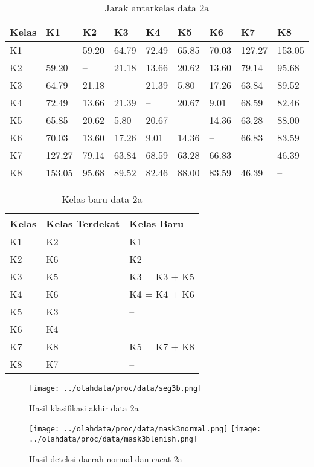 \documentclass[laporan.tex]{subfiles}
\begin{document}
\begin{table}[h!]
\centering
\begin{tabular}{|l|l|l|l|l|l|l|l|l|}
\hline
Kelas & K1 & K2 & K3 & K4 & K5 & K6 & K7 & K8 \\
\hline
K1 & -- & 59.20 & 64.79 & 72.49 & 65.85 & 70.03 & 127.27 & 153.05 \\
K2 & 59.20 & -- & 21.18 & 13.66 & 20.62 & 13.60 & 79.14 & 95.68 \\
K3 & 64.79 & 21.18 & --	& 21.39 & 5.80 & 17.26 & 63.84 & 89.52 \\
K4 & 72.49 & 13.66 & 21.39 & --	& 20.67 & 9.01 & 68.59 & 82.46 \\
K5 & 65.85 & 20.62 & 5.80 & 20.67 & -- & 14.36 & 63.28 & 88.00 \\
K6 & 70.03 & 13.60 & 17.26 & 9.01 & 14.36 & -- & 66.83 & 83.59 \\
K7 & 127.27 & 79.14 & 63.84 & 68.59 & 63.28 & 66.83 & -- & 46.39 \\
K8 & 153.05 & 95.68 & 89.52 & 82.46 & 88.00 & 83.59 & 46.39 & -- \\
\hline
\end{tabular}
\caption[]{Jarak antarkelas data 2a}
\label{table:distyellow}
\end{table}

\begin{table}[h!]
\centering
\begin{tabular}{|l|l|l|}
\hline
Kelas & Kelas Terdekat & Kelas Baru \\
\hline
K1 & K2 & K1 \\
K2 & K6 & K2 \\
K3 & K5 & K3 = K3 + K5 \\
K4 & K6 & K4 = K4 + K6 \\
K5 & K3 & -- \\
K6 & K4 & -- \\
K7 & K8 & K5 = K7 + K8 \\
K8 & K7 & -- \\
\hline
\end{tabular}
\caption[]{Kelas baru data 2a}
\label{table:clsyellow2}
\end{table}

\begin{figure}[h!]
\centering
\texttt{[image: ../olahdata/proc/data/seg3b.png]}
\caption{Hasil klasifikasi akhir data 2a}
\end{figure}

\begin{figure}[h!]
\centering
\texttt{[image: ../olahdata/proc/data/mask3normal.png]} \qquad
\texttt{[image: ../olahdata/proc/data/mask3blemish.png]}
\caption[]{Hasil deteksi daerah normal dan cacat 2a}
\end{figure}
\end{document}
